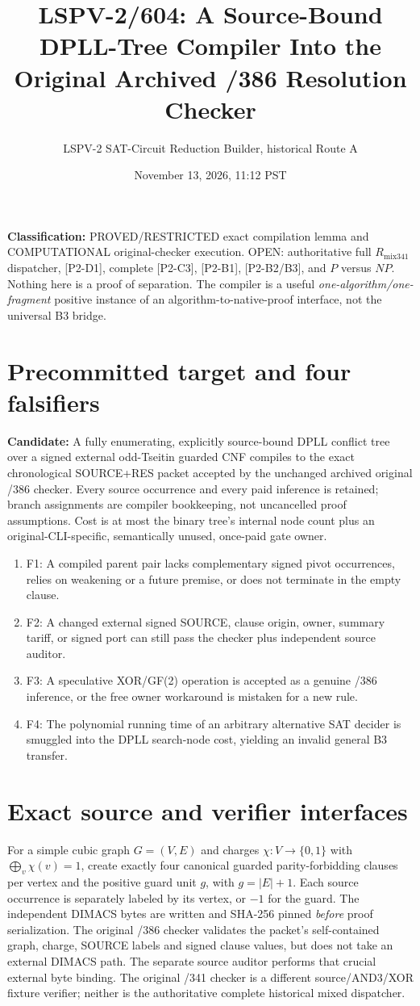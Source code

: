\documentclass[11pt]{article}
\title{LSPV-2/604: A Source-Bound DPLL-Tree Compiler Into the Original Archived /386 Resolution Checker}
\author{LSPV-2 SAT-Circuit Reduction Builder, historical Route A}
\date{November 13, 2026, 11:12 PST}
\begin{document}
\maketitle
\noindent\textbf{Classification:} PROVED/RESTRICTED exact compilation lemma and COMPUTATIONAL original-checker execution. OPEN: authoritative full $R_{\mathrm{mix341}}$ dispatcher, [P2-D1], complete [P2-C3], [P2-B1], [P2-B2/B3], and $P$ versus $NP$. Nothing here is a proof of separation. The compiler is a useful \emph{one-algorithm/one-fragment} positive instance of an algorithm-to-native-proof interface, not the universal B3 bridge.

\section*{Precommitted target and four falsifiers}
\noindent\textbf{Candidate:} A fully enumerating, explicitly source-bound DPLL conflict tree over a signed external odd-Tseitin guarded CNF compiles to the exact chronological SOURCE+RES packet accepted by the unchanged archived original /386 checker. Every source occurrence and every paid inference is retained; branch assignments are compiler bookkeeping, not uncancelled proof assumptions. Cost is at most the binary tree's internal node count plus an original-CLI-specific, semantically unused, once-paid gate owner.
\begin{enumerate}
\item[] F1: A compiled parent pair lacks complementary signed pivot occurrences, relies on weakening or a future premise, or does not terminate in the empty clause.
\item[] F2: A changed external signed SOURCE, clause origin, owner, summary tariff, or signed port can still pass the checker plus independent source auditor.
\item[] F3: A speculative XOR/GF(2) operation is accepted as a genuine /386 inference, or the free owner workaround is mistaken for a new rule.
\item[] F4: The polynomial running time of an arbitrary alternative SAT decider is smuggled into the DPLL search-node cost, yielding an invalid general B3 transfer.
\end{enumerate}

\section*{Exact source and verifier interfaces}
For a simple cubic graph $G=(V,E)$ and charges $\chi:V\to\{0,1\}$ with $\bigoplus_v\chi(v)=1$, create exactly four canonical guarded parity-forbidding clauses per vertex and the positive guard unit $g$, with $g=|E|+1$. Each source occurrence is separately labeled by its vertex, or $-1$ for the guard. The independent DIMACS bytes are written and SHA-256 pinned \emph{before} proof serialization. The original /386 checker validates the packet's self-contained graph, charge, SOURCE labels and signed clause values, but does not take an external DIMACS path. The separate source auditor performs that crucial external byte binding. The original /341 checker is a different source/AND3/XOR fixture verifier; neither is the authoritative complete historical mixed dispatcher.
\end{document}
